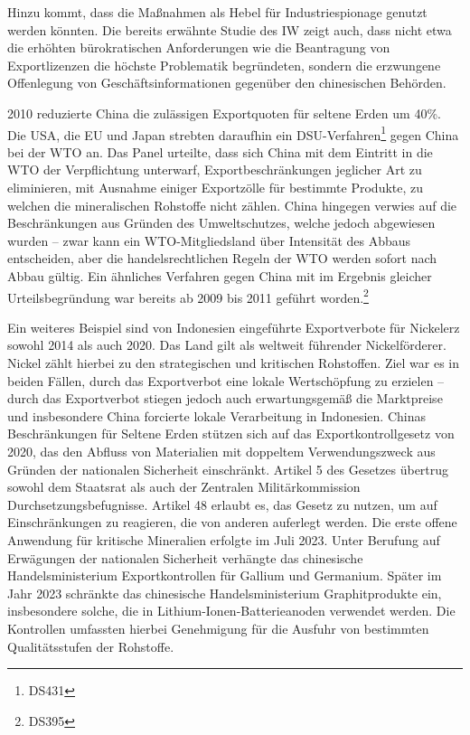 \documentclass[12pt,a4paper,oneside]{book} %
\begin{document}
Hinzu kommt, dass die Maßnahmen als Hebel für Industriespionage genutzt werden könnten.\autocite{IW-Trends_2026-2-6_Neligan_et_al_Rohstoffe, S. 108} Die bereits erwähnte Studie des IW zeigt auch, dass nicht etwa die erhöhten bürokratischen Anforderungen wie die Beantragung von Exportlizenzen die höchste Problematik begründeten, sondern die erzwungene Offenlegung von Geschäftsinformationen gegenüber den chinesischen Behörden.\autocite{IW-Trends_2026-2-6_Neligan_et_al_Rohstoffe, S. 110}

2010 reduzierte China die zulässigen Exportquoten für seltene Erden um 40\%. Die USA, die EU und Japan strebten daraufhin ein DSU-Verfahren\footnote{DS431} gegen China bei der WTO an.\autocite{EuZW 2012, 286} Das Panel urteilte, dass sich China mit dem Eintritt in die WTO der Verpflichtung unterwarf, Exportbeschränkungen jeglicher Art zu eliminieren, mit Ausnahme einiger Exportzölle für bestimmte Produkte, zu welchen die mineralischen Rohstoffe nicht zählen. China hingegen verwies auf die Beschränkungen aus Gründen des Umweltschutzes, welche jedoch abgewiesen wurden -- zwar kann ein WTO-Mitgliedsland über Intensität des Abbaus entscheiden, aber die handelsrechtlichen Regeln der WTO werden sofort nach Abbau gültig.\autocites{EuZW 2014, 684}{EuZW 2014, 283} Ein ähnliches Verfahren gegen China mit im Ergebnis gleicher Urteilsbegründung war bereits ab 2009 bis 2011 geführt worden.\footnote{DS395}


Ein weiteres Beispiel sind von Indonesien eingeführte Exportverbote für Nickelerz sowohl 2014 als auch 2020. Das Land gilt als weltweit führender Nickelförderer.\autocite[52]{DERA Rohstoffinformation Indonesien, } Nickel zählt hierbei zu den strategischen und kritischen Rohstoffen. Ziel war es in beiden Fällen, durch das Exportverbot eine lokale Wertschöpfung zu erzielen -- durch das Exportverbot stiegen jedoch auch erwartungsgemäß die Marktpreise und insbesondere China forcierte lokale Verarbeitung in Indonesien.\autocite{DERA} Chinas Beschränkungen für Seltene Erden stützen sich auf das Exportkontrollgesetz von 2020, das den Abfluss von Materialien mit doppeltem Verwendungszweck aus Gründen der nationalen Sicherheit einschränkt. Artikel 5 des Gesetzes übertrug sowohl dem Staatsrat als auch der Zentralen Militärkommission Durchsetzungsbefugnisse. Artikel 48 erlaubt es, das Gesetz zu nutzen, um auf Einschränkungen zu reagieren, die von anderen auferlegt werden. Die erste offene Anwendung für kritische Mineralien erfolgte im Juli 2023. Unter Berufung auf Erwägungen der nationalen Sicherheit verhängte das chinesische Handelsministerium Exportkontrollen für Gallium und Germanium. Später im Jahr 2023 schränkte das chinesische Handelsministerium Graphitprodukte ein, insbesondere solche, die in Lithium-Ionen-Batterieanoden verwendet werden. Die Kontrollen umfassten hierbei Genehmigung für die Ausfuhr von bestimmten Qualitätsstufen der Rohstoffe.
\end{document}
